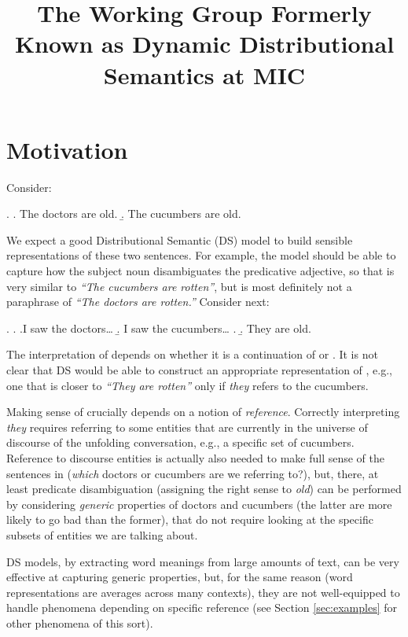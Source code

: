 \documentclass[a4paper,12pt]{article}
\title{The Working Group Formerly Known as Dynamic Distributional
  Semantics at MIC}
\begin{document}
\maketitle

\section{Motivation}
\label{sec:motivation}

Consider:

\ex.\label{ex1} \a. The doctors are old.
\b. The cucumbers are old.

We expect a good Distributional Semantic (DS) model to build sensible
representations of these two sentences. For example, the model should
be able to capture how the subject noun disambiguates the predicative
adjective, so that \Last[b] is very similar to \emph{``The cucumbers
  are rotten''}, but \Last[a] is most definitely not a paraphrase of
\emph{``The doctors are rotten.''} Consider next:

\ex. \label{ex:discourse-context}
\a. \a.I saw the doctors\ldots 
    \b. I saw the cucumbers\ldots
\z.
\b.\label{ex:they-are-old} They are old.

The interpretation of \Last[b] depends on whether it is a continuation
of \Last[a-i] or \Last[a-ii]. It is not clear that DS would be able to
construct an appropriate representation of \Last[b], e.g., one that is
closer to \emph{``They are rotten''} only if \emph{they} refers to the
cucumbers.

Making sense of \Last[b] crucially depends on a notion of
\emph{reference}.  Correctly interpreting \emph{they} requires
referring to some entities that are currently in the universe of
discourse of the unfolding conversation, e.g., a specific set of
cucumbers. Reference to discourse entities is actually also needed to
make full sense of the sentences in \LLast (\emph{which} doctors or
cucumbers are we referring to?), but, there, at least predicate
disambiguation (assigning the right sense to \emph{old}) can be
performed by considering \emph{generic} properties of doctors and
cucumbers (the latter are more likely to go bad than the former), that
do not require looking at the specific subsets of entities we are
talking about.

DS models, by extracting word meanings from large amounts of text, can
be very effective at capturing generic properties, but, for the same
reason (word representations are averages across many contexts), they
are not well-equipped to handle phenomena depending on specific
reference (see Section \ref{sec:examples} for other phenomena of this
sort).
\end{document}
